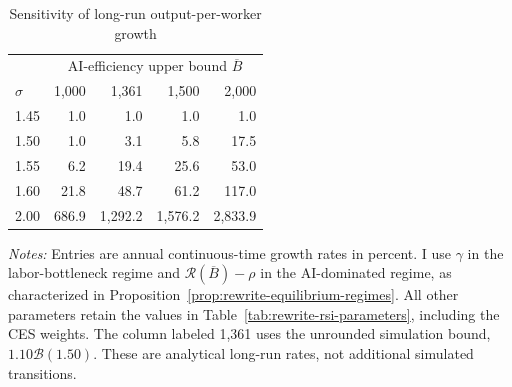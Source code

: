 \begin{table}[htbp]
\centering
\caption{Sensitivity of long-run output-per-worker growth}
\label{tab:rewrite-growth-sensitivity}
\small{}
\begin{tabular}{lrrrr}
\toprule
& \multicolumn{4}{c}{AI-efficiency upper bound $\overline B$}\\
$\sigma$ & 1,000 & 1,361 & 1,500 & 2,000\\
\midrule
1.45 & 1.0 & 1.0 & 1.0 & 1.0\\
1.50 & 1.0 & 3.1 & 5.8 & 17.5\\
1.55 & 6.2 & 19.4 & 25.6 & 53.0\\
1.60 & 21.8 & 48.7 & 61.2 & 117.0\\
2.00 & 686.9 & 1,292.2 & 1,576.2 & 2,833.9\\
\bottomrule
\end{tabular}
\par\vspace{4pt}
\parbox{0.95\textwidth}{\footnotesize\emph{Notes:} Entries are annual continuous-time growth rates in percent. I use $\gamma$ in the labor-bottleneck regime and $\mathcal R(\overline B)-\rho$ in the AI-dominated regime, as characterized in Proposition~\ref{prop:rewrite-equilibrium-regimes}. All other parameters retain the values in Table~\ref{tab:rewrite-rsi-parameters}, including the CES weights. The column labeled 1,361 uses the unrounded simulation bound, $1.10\mathcal B(1.50)$. These are analytical long-run rates, not additional simulated transitions.}
\end{table}
